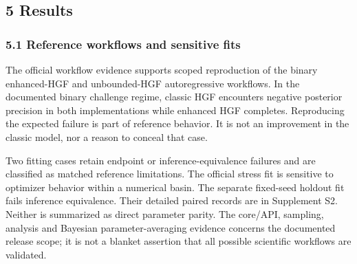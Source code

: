 \documentclass[
  11pt,
]{article}
\begin{document}
\subsection{5 Results}\label{results}

\subsubsection{5.1 Reference workflows and sensitive
fits}\label{reference-workflows-and-sensitive-fits}

The official workflow evidence supports scoped reproduction of the
binary enhanced-HGF and unbounded-HGF autoregressive workflows. In the
documented binary challenge regime, classic HGF encounters negative
posterior precision in both implementations while enhanced HGF
completes. Reproducing the expected failure is part of reference
behavior. It is not an improvement in the classic model, nor a reason to
conceal that case.

Two fitting cases retain endpoint or inference-equivalence failures and
are classified as matched reference limitations. The official stress fit
is sensitive to optimizer behavior within a numerical basin. The
separate fixed-seed holdout fit fails inference equivalence. Their
detailed paired records are in Supplement S2. Neither is summarized as
direct parameter parity. The core/API, sampling, analysis and Bayesian
parameter-averaging evidence concerns the documented release scope; it
is not a blanket assertion that all possible scientific workflows are
validated.
\end{document}
